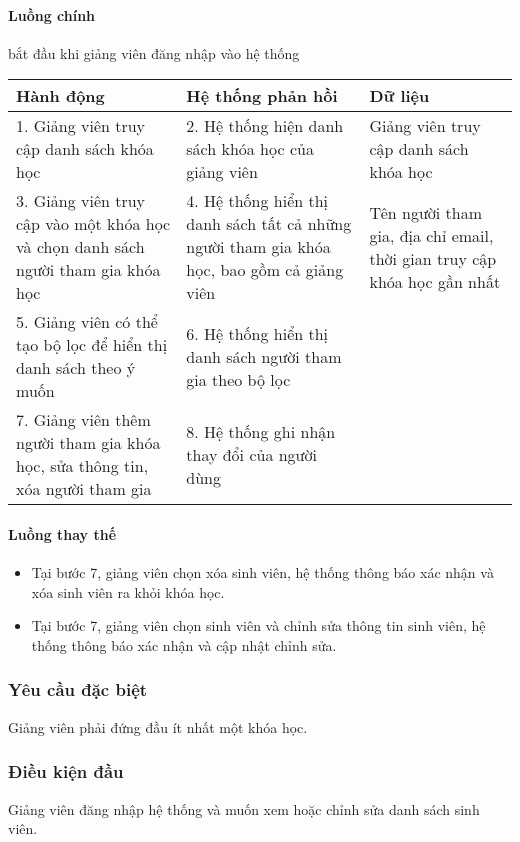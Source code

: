 \documentclass[./../main_file.tex]{subfiles}
\begin{document}
\paragraph{Luồng chính}
bắt đầu khi giảng viên đăng nhập vào hệ thống
\begin{longtable}{|p{}|p{}|p{}|}
		\hline
		\textbf{Hành động}                                                         & \textbf{Hệ thống phản hồi}                             & \textbf{Dữ liệu} \\ \hline
		1. Giảng viên truy cập danh sách khóa học & 2. Hệ thống hiện danh sách khóa học của giảng viên & Giảng viên truy cập danh sách khóa học \\ \hline
		3. Giảng viên truy cập vào một khóa học và chọn danh sách người tham gia khóa học &
		4. Hệ thống hiển thị danh sách tất cả những người tham gia khóa học, bao gồm cả giảng viên &
		Tên người tham gia, địa chỉ email, thời gian truy cập khóa học gần nhất \\ \hline
		5. Giảng viên có thể tạo bộ lọc để hiển thị danh sách theo ý muốn             & 6. Hệ thống hiển thị danh sách người tham gia theo bộ lọc &                  \\ \hline
		7. Giảng viên thêm người tham gia khóa học, sửa thông tin, xóa người tham gia & 8. Hệ thống ghi nhận thay đổi của người dùng              &                  \\ \hline
\end{longtable}
\paragraph{Luồng thay thế}
\begin{itemize}
\item Tại bước 7, giảng viên chọn xóa sinh viên, hệ thống thông báo xác nhận và xóa sinh viên ra khỏi khóa học.
\item Tại bước 7, giảng viên chọn sinh viên và chỉnh sửa thông tin sinh viên, hệ thống thông báo xác nhận và cập nhật chỉnh sửa.
\end{itemize}
\subsubsection{Yêu cầu đặc biệt}
Giảng viên phải đứng đầu ít nhất một khóa học.

\subsubsection{Điều kiện đầu}
Giảng viên đăng nhập hệ thống và muốn xem hoặc chỉnh sửa danh sách sinh viên.
\end{document}
